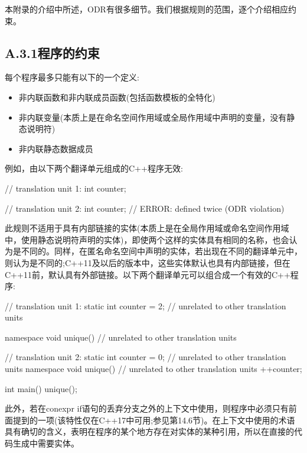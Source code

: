 
本附录的介绍中所述，ODR有很多细节。我们根据规则的范围，逐个介绍相应约束。

\subsection{A.3.1\hspace{0.2cm}程序的约束}

每个程序最多只能有以下的一个定义:

\begin{itemize}
\item 
非内联函数和非内联成员函数(包括函数模板的全特化)

\item 
非内联变量(本质上是在命名空间作用域或全局作用域中声明的变量，没有静态说明符)

\item 
非内联静态数据成员
\end{itemize}

例如，由以下两个翻译单元组成的C++程序无效:

\begin{cpp}
// translation unit 1:
int counter;

// translation unit 2:
int counter; // ERROR: defined twice (ODR violation)
\end{cpp}

此规则不适用于具有内部链接的实体(本质上是在全局作用域或命名空间作用域中，使用静态说明符声明的实体)，即使两个这样的实体具有相同的名称，也会认为是不同的。同样，在匿名命名空间中声明的实体，若出现在不同的翻译单元中，则认为是不同的;C++11及以后的版本中，这些实体默认也具有内部链接，但在C++11前，默认具有外部链接。以下两个翻译单元可以组合成一个有效的C++程序:

\begin{cpp}
// translation unit 1:
static int counter = 2; // unrelated to other translation units

namespace {
	void unique() // unrelated to other translation units
	{ }
}

// translation unit 2:
static int counter = 0; // unrelated to other translation units
namespace {
	void unique() // unrelated to other translation units
	{
		++counter;
	}
}

int main()
{
	unique();
}
\end{cpp}

此外，若在conexpr if语句的丢弃分支之外的上下文中使用，则程序中必须只有前面提到的一项(该特性仅在C++17中可用;参见第14.6节)。在上下文中使用的术语具有确切的含义，表明在程序的某个地方存在对实体的某种引用，所以在直接的代码生成中需要实体。

